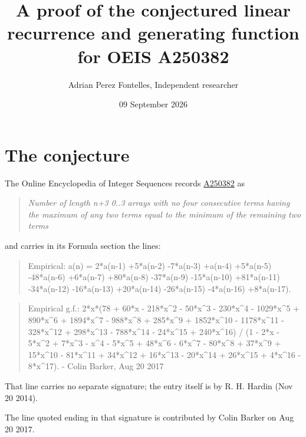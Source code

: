 \documentclass[11pt]{article}
\title{A proof of the conjectured linear recurrence and generating function for OEIS A250382}
\author{Adrian Perez Fontelles, Independent researcher}
\date{09 September 2026}
\theoremstyle{definition}
\begin{document}
\maketitle
\section{The conjecture}

The Online Encyclopedia of Integer Sequences records \href{https://oeis.org/A250382}{A250382} as

\begin{quote}\itshape Number of length n+3 0..3 arrays with no four consecutive terms having the maximum of any two terms equal to the minimum of the remaining two terms\end{quote}

and carries in its Formula section the lines:

\begin{quote}\ttfamily Empirical: a(n) = 2*a(n-1) +5*a(n-2) -7*a(n-3) +a(n-4) +5*a(n-5) -48*a(n-6) +6*a(n-7) +80*a(n-8) -37*a(n-9) -15*a(n-10) +81*a(n-11) -34*a(n-12) -16*a(n-13) +20*a(n-14) -26*a(n-15) -4*a(n-16) +8*a(n-17).\end{quote}

\begin{quote}\ttfamily Empirical g.f.: 2*x*(78 + 60*x - 218*x\textasciicircum{}2 - 50*x\textasciicircum{}3 - 230*x\textasciicircum{}4 - 1029*x\textasciicircum{}5 + 890*x\textasciicircum{}6 + 1894*x\textasciicircum{}7 - 988*x\textasciicircum{}8 + 285*x\textasciicircum{}9 + 1852*x\textasciicircum{}10 - 1178*x\textasciicircum{}11 - 328*x\textasciicircum{}12 + 298*x\textasciicircum{}13 - 788*x\textasciicircum{}14 - 24*x\textasciicircum{}15 + 240*x\textasciicircum{}16) / (1 - 2*x - 5*x\textasciicircum{}2 + 7*x\textasciicircum{}3 - x\textasciicircum{}4 - 5*x\textasciicircum{}5 + 48*x\textasciicircum{}6 - 6*x\textasciicircum{}7 - 80*x\textasciicircum{}8 + 37*x\textasciicircum{}9 + 15*x\textasciicircum{}10 - 81*x\textasciicircum{}11 + 34*x\textasciicircum{}12 + 16*x\textasciicircum{}13 - 20*x\textasciicircum{}14 + 26*x\textasciicircum{}15 + 4*x\textasciicircum{}16 - 8*x\textasciicircum{}17). - Colin Barker, Aug 20 2017\end{quote}

That line carries no separate signature; the entry itself is by R. H. Hardin (Nov 20 2014).

The line quoted ending in that signature is contributed by Colin Barker on Aug 20 2017.
\end{document}

